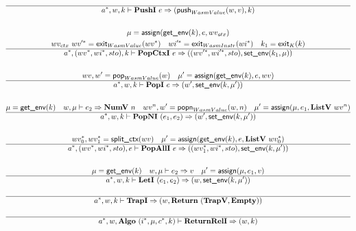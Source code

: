 \begin{gather*}
  \hline
  \seq{a}, w, k \vdash \pushi ~ e \Rightarrow (\push_{WasmValue}(w, v), k) \\
%
\newline \\
  \mu = \assign(\getenv(k), e, wv_{ctx}) \\
  wv_{ctx} ~ \seq{wv'} = \exit_{WasmValue}(\seq{wv}) \quad
  \seq{wi'} = \exit_{WasmInstr}(\seq{wi}) \quad
  k_1 = \exit_{K}(k) \\
  \hline
  \seq{a}, (\seq{wv}, \seq{wi}, sto), k \vdash \popctxi ~ e
  \Rightarrow
  ((\seq{wv'}, \seq{wi'}, sto), \setenv(k_1, \mu)) \\
%
\newline \\
  wv, w' = \pop_{WasmValue}(w) \quad
  \mu' = \assign(\getenv(k), e, wv) \\
  \hline
  \seq{a}, w, k \vdash \popi ~ e \Rightarrow (w', \setenv(k, \mu')) \\
%
\newline \\
  \mu = \getenv(k) \quad
  w, \mu \vdash e_2 \Rightarrow \numv ~ n \quad
  wv^n, w' = \popn_{WasmValue}(w, n) \quad
  \mu' = \assign(\mu, e_1, \listv ~ wv^n) \\
  \hline
  \seq{a}, w, k \vdash \popni ~ (e_1, e_2) \Rightarrow (w', \setenv(k, \mu')) \\
%
\newline \\
  \seq{wv_0}, \seq{wv_1} = \splitctx(wv) \quad
  \mu' = \assign(\getenv(k), e, \listv ~ \seq{wv_0}) \\
  \hline
  \seq{a}, (\seq{wv}, \seq{wi}, sto), e \vdash \popalli ~ e
  \Rightarrow
  ((\seq{wv_1}, \seq{wi}, sto), \setenv(k, \mu')) \\
%
\newline \\
  \mu = \getenv(k) \quad
  w, \mu \vdash e_2 \Rightarrow v \quad
  \mu' = \assign(\mu, e_1, v) \\
  \hline
  \seq{a}, w, k \vdash \leti ~ (e_1, e_2)
  \Rightarrow
  (w, \setenv(k, \mu')) \\
%
\newline \\
  \hline
  \seq{a}, w, k \vdash \trapi \Rightarrow (w, \ret ~ (\trapv, \mt)) \\
%
\newline \\
  \hline
  \seq{a}, w, \algo~ (\seq{i}, \mu, \seq c, k) \vdash \returnreli \Rightarrow (w, k) \\

\end{gather*}
